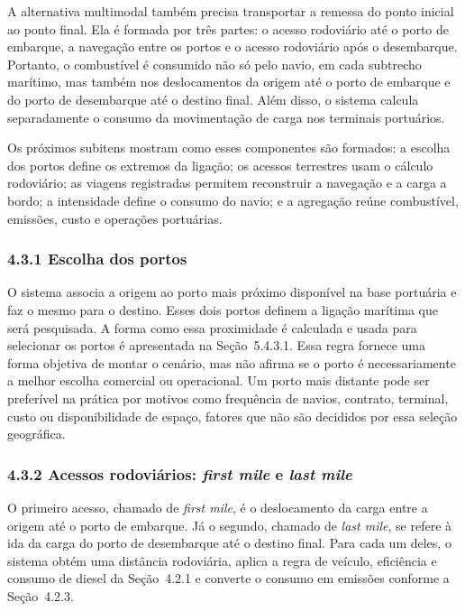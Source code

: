 \documentclass[brazil,]{article}
\let\oldsubsubsection\subsubsection
\renewcommand{\subsubsection}{\Needspace{10\baselineskip}\oldsubsubsection}
\begin{document}
A alternativa multimodal também precisa transportar a remessa do ponto
inicial ao ponto final. Ela é formada por três partes: o acesso
rodoviário até o porto de embarque, a navegação entre os portos e o
acesso rodoviário após o desembarque. Portanto, o combustível é
consumido não só pelo navio, em cada subtrecho marítimo, mas também nos
deslocamentos da origem até o porto de embarque e do porto de
desembarque até o destino final. Além disso, o sistema calcula
separadamente o consumo da movimentação de carga nos terminais
portuários.

Os próximos subitens mostram como esses componentes são formados: a
escolha dos portos define os extremos da ligação; os acessos terrestres
usam o cálculo rodoviário; as viagens registradas permitem reconstruir a
navegação e a carga a bordo; a intensidade define o consumo do navio; e
a agregação reúne combustível, emissões, custo e operações portuárias.

\hypertarget{escolha-dos-portos}{%
\subsubsection{4.3.1 Escolha dos portos}\label{escolha-dos-portos}}

O sistema associa a origem ao porto mais próximo disponível na base
portuária e faz o mesmo para o destino. Esses dois portos definem a
ligação marítima que será pesquisada. A forma como essa proximidade é
calculada e usada para selecionar os portos é apresentada na
Seção~5.4.3.1. Essa regra fornece uma forma objetiva de montar o
cenário, mas não afirma se o porto é necessariamente a melhor escolha
comercial ou operacional. Um porto mais distante pode ser preferível na
prática por motivos como frequência de navios, contrato, terminal, custo
ou disponibilidade de espaço, fatores que não são decididos por essa
seleção geográfica.

\hypertarget{acessos-rodoviuxe1rios-first-mile-e-last-mile}{%
\subsubsection{\texorpdfstring{4.3.2 Acessos rodoviários: \emph{first
mile} e \emph{last
mile}}{4.3.2 Acessos rodoviários: first mile e last mile}}\label{acessos-rodoviuxe1rios-first-mile-e-last-mile}}

O primeiro acesso, chamado de \emph{first mile}, é o deslocamento da
carga entre a origem até o porto de embarque. Já o segundo, chamado de
\emph{last mile}, se refere à ida da carga do porto de desembarque até o
destino final. Para cada um deles, o sistema obtém uma distância
rodoviária, aplica a regra de veículo, eficiência e consumo de diesel da
Seção~4.2.1 e converte o consumo em emissões conforme a Seção~4.2.3.
\end{document}
